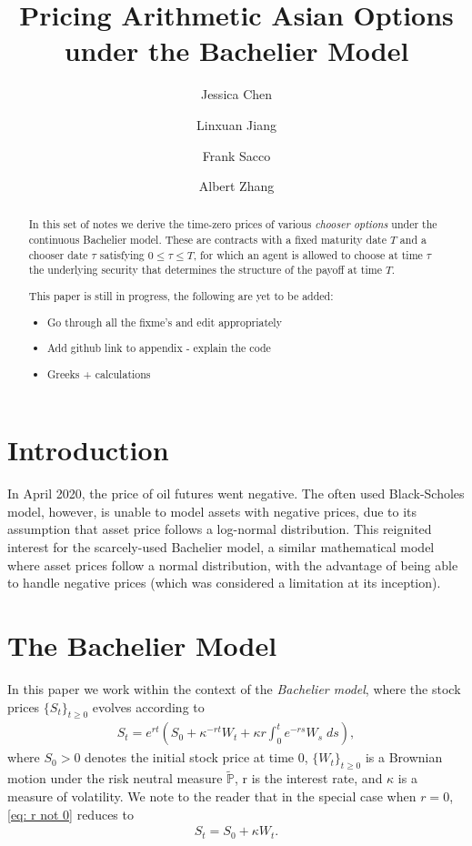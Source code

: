 \documentclass[reqno]{amsart}
\title{Pricing Arithmetic Asian Options under the Bachelier Model} %
\author{Jessica Chen}
\author{Linxuan Jiang}
\author{Frank Sacco}
\author{Albert Zhang}
\begin{document}
\begin{abstract}
     In this set of notes we derive the time-zero prices of various \emph{chooser options} under the continuous Bachelier model.
     These are contracts with a fixed maturity date $T$ and a chooser date $\tau$ satisfying $0 \le \tau \le T$, for which an agent is allowed to choose at time $\tau$ the underlying security that determines the structure of the payoff at time $T$.  

     This paper is still in progress, the following are yet to be added:
     \begin{itemize}
          \item Go through all the fixme's and edit appropriately
          \item Add github link to appendix - explain the code
          \item Greeks + calculations
     \end{itemize}
\end{abstract}


\maketitle  
\tableofcontents

\section{Introduction}
In April 2020, the price of oil futures went negative.
The often used Black-Scholes model, however, is unable to model assets with negative prices, due to its assumption that asset price follows a log-normal distribution.
This reignited interest for the scarcely-used Bachelier model, a similar mathematical model where asset prices follow a normal distribution, with the advantage of being able to handle negative prices (which was considered a limitation at its inception).

\section{The Bachelier Model}
In this paper we work within the context of the \emph{Bachelier model}, where the stock prices $\{S_t\}_{t \ge 0}$ evolves according to 
\begin{align}\label{eq: r not 0}
	 S_t = e^{rt} \left( S_0 + \kappa^{-rt}W_t + \kappa r \int_0^t e^{-rs} W_s \; ds \right),
\end{align}
where $S_0 > 0$ denotes the initial stock price at time 0, $\{W_t\}_{t \ge 0}$ is a Brownian motion under the risk neutral measure $\tilde{\mathbb{P}}$, r is the interest rate, and $\kappa$ is a measure of volatility.
We note to the reader that in the special case when $r = 0$, \eqref{eq: r not 0} reduces to 
\begin{align}\label{eq: r=0}
      S_t = S_0 + \kappa W_t. 
\end{align}
\end{document}
